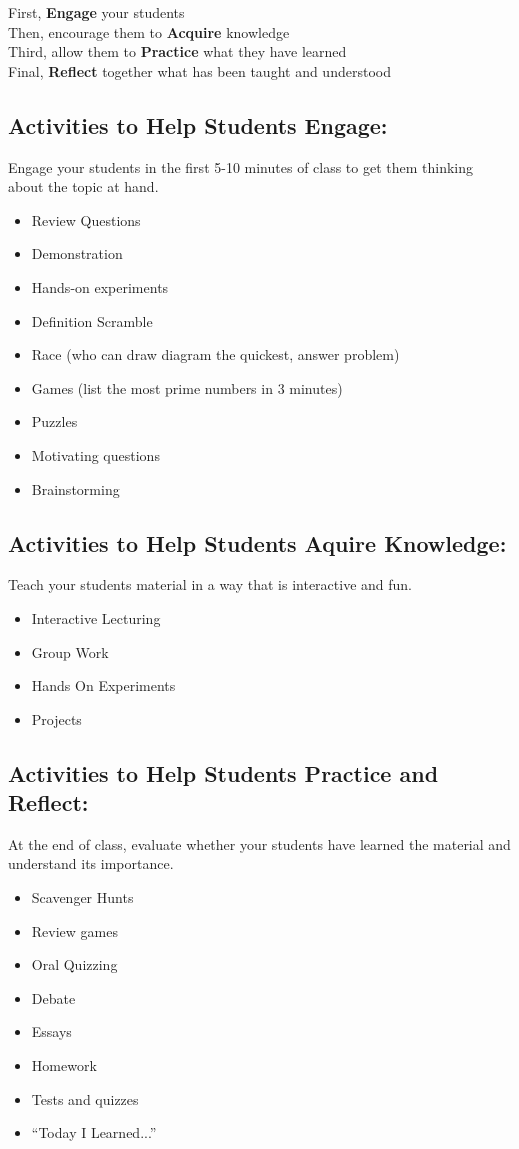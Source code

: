 \begin{flushleft}
First, \textbf{Engage} your students \\
Then, encourage them to \textbf{Acquire} knowledge \\
Third, allow them to \textbf{Practice} what they have learned \\
Final, \textbf{Reflect} together what has been taught and understood \\
\end{flushleft}

\subsection{Activities to Help Students Engage:}
Engage your students in the first 5-10 minutes of class to get them thinking about the topic at hand.
\begin{itemize}
 \item Review Questions
 \item Demonstration
 \item Hands-on experiments
 \item Definition Scramble
 \item Race (who can draw diagram the quickest, answer problem)
 \item Games (list the most prime numbers in 3 minutes)
 \item Puzzles
 \item Motivating questions 
 \item Brainstorming
\end{itemize}

\subsection{Activities to Help Students Aquire Knowledge:}
Teach your students material in a way that is interactive and fun.  
\begin{itemize}
 \item Interactive Lecturing
 \item Group Work
 \item Hands On Experiments
 \item Projects
\end{itemize}

\subsection{Activities to Help Students Practice and Reflect:}
At the end of class, evaluate whether your students have learned the material and understand its importance.
\begin{itemize}
 \item Scavenger Hunts
 \item Review games
 \item Oral Quizzing
 \item Debate
 \item Essays
 \item Homework
 \item Tests and quizzes
 \item ``Today I Learned...''
\end{itemize}

